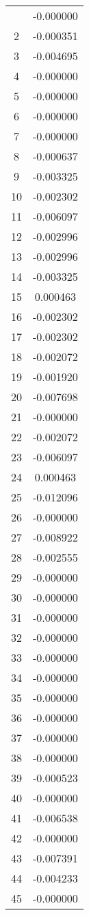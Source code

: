 \documentclass[12pt]{article}
\begin{document}
\begin{longtable}{@{}cc@{}}
\bottomrule
\endlastfoot
1 & -0.000000 \\
2 & -0.000351 \\
3 & -0.004695 \\
4 & -0.000000 \\
5 & -0.000000 \\
6 & -0.000000 \\
7 & -0.000000 \\
8 & -0.000637 \\
9 & -0.003325 \\
10 & -0.002302 \\
11 & -0.006097 \\
12 & -0.002996 \\
13 & -0.002996 \\
14 & -0.003325 \\
15 & 0.000463 \\
16 & -0.002302 \\
17 & -0.002302 \\
18 & -0.002072 \\
19 & -0.001920 \\
20 & -0.007698 \\
21 & -0.000000 \\
22 & -0.002072 \\
23 & -0.006097 \\
24 & 0.000463 \\
25 & -0.012096 \\
26 & -0.000000 \\
27 & -0.008922 \\
28 & -0.002555 \\
29 & -0.000000 \\
30 & -0.000000 \\
31 & -0.000000 \\
32 & -0.000000 \\
33 & -0.000000 \\
34 & -0.000000 \\
35 & -0.000000 \\
36 & -0.000000 \\
37 & -0.000000 \\
38 & -0.000000 \\
39 & -0.000523 \\
40 & -0.000000 \\
41 & -0.006538 \\
42 & -0.000000 \\
43 & -0.007391 \\
44 & -0.004233 \\
45 & -0.000000 \\

\end{longtable}
\end{document}
